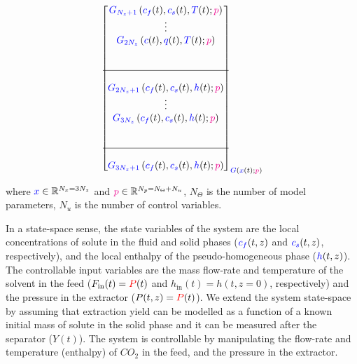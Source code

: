 \documentclass[../Article_Model_Parameters.tex]{subfiles}
\begin{document}
{\begin{align*}
{\begin{bmatrix}
							{\color{blue}G_{N_z+1}} \left( {\color{blue}c_f}(t),{\color{blue}c_s}(t),{\color{blue}T}(t); {\color{magenta}p} \right)\\ 
							\vdots\\
							{\color{blue}G_{2N_z}} \left( {\color{blue}c}(t),{\color{blue}q}(t),{\color{blue}T}(t); {\color{magenta}p} \right)\\ 
							\\ \\ \hline \\ 
							{\color{blue}G_{2N_z+1}} \left( {\color{blue}c_f}(t),{\color{blue}c_s}(t),{\color{blue}h}(t); {\color{magenta}p} \right) \\
							\vdots\\
							{\color{blue}G_{3N_z}} \left( {\color{blue}c_f}(t),{\color{blue}c_s}(t),{\color{blue}h}(t); {\color{magenta}p} \right) \\ 
							\\ \\ \hline \\
							{\color{blue}G_{3N_z+1}} \left( {\color{blue}c_f}(t),{\color{blue}c_s}(t),{\color{blue}h}(t); {\color{magenta}p} \right) 
					\end{bmatrix}}_{{\color{blue}G} \left( {\color{blue}x}(t); {\color{magenta}p} \right)} 
			\end{align*} }
			
			where ${\color{blue}x} \in \mathbb{R}^{N_x = 3N_z} $ and ${\color{magenta}p} \in \mathbb{R}^{N_p =  N_{\Theta} + N_u } $, $N_{\Theta}$ is the number of model parameters, $N_{u}$ is the number of control variables.
			
			In a state-space sense, the state variables of the system are the local concentrations of solute in the fluid and solid phases (${\color{blue}c_f}(t,z)$ and ${\color{blue}c_s}(t,z)$, respectively), and the local enthalpy of the pseudo-homogeneous phase (${\color{blue}h}(t,z)$). The controllable input variables are the mass flow-rate and temperature of the solvent in the feed ($F_\text{in}(t) = {\color{red}P}(t)$ and $h_\text{in}(t) = h(t,z=0)$, respectively) and the pressure in the extractor ($P(t,z) ={\color{red}P}(t)$). We extend the system state-space by assuming that extraction yield can be modelled as a function of a known initial mass of solute in the solid phase and it can be measured after the separator ($Y(t)$). The system is controllable by manipulating the flow-rate and temperature (enthalpy) of $CO_2$ in the feed, and the pressure in the extractor.
			
\end{document}
